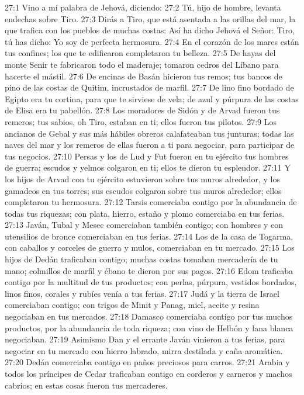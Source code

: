 27:1 Vino a mí palabra de Jehová, diciendo:   
27:2 Tú, hijo de hombre, levanta endechas sobre Tiro.   
27:3 Dirás a Tiro, que está asentada a las orillas del mar, la que trafica con los pueblos de muchas costas: Así ha dicho Jehová el Señor: Tiro, tú has dicho: Yo soy de perfecta hermosura.   
27:4 En el corazón de los mares están tus confines; los que te edificaron completaron tu belleza.   
27:5 De hayas del monte Senir te fabricaron todo el maderaje; tomaron cedros del Líbano para hacerte el mástil.   
27:6 De encinas de Basán hicieron tus remos; tus bancos de pino de las costas de Quitim, incrustados de marfil.   
27:7 De lino fino bordado de Egipto era tu cortina, para que te sirviese de vela; de azul y púrpura de las costas de Elisa era tu pabellón.   
27:8 Los moradores de Sidón y de Arvad fueron tus remeros; tus sabios, oh Tiro, estaban en ti; ellos fueron tus pilotos.   
27:9 Los ancianos de Gebal y sus más hábiles obreros calafateaban tus junturas; todas las naves del mar y los remeros de ellas fueron a ti para negociar, para participar de tus negocios.   
27:10 Persas y los de Lud y Fut fueron en tu ejército tus hombres de guerra; escudos y yelmos colgaron en ti; ellos te dieron tu esplendor.   
27:11 Y los hijos de Arvad con tu ejército estuvieron sobre tus muros alrededor, y los gamadeos en tus torres; sus escudos colgaron sobre tus muros alrededor; ellos completaron tu hermosura.   
27:12 Tarsis comerciaba contigo por la abundancia de todas tus riquezas; con plata, hierro, estaño y plomo comerciaba en tus ferias.   
27:13 Javán, Tubal y Mesec comerciaban también contigo; con hombres y con utensilios de bronce comerciaban en tus ferias.   
27:14 Los de la casa de Togarma, con caballos y corceles de guerra y mulos, comerciaban en tu mercado.   
27:15 Los hijos de Dedán traficaban contigo; muchas costas tomaban mercadería de tu mano; colmillos de marfil y ébano te dieron por sus pagos.   
27:16 Edom traficaba contigo por la multitud de tus productos; con perlas, púrpura, vestidos bordados, linos finos, corales y rubíes venía a tus ferias.   
27:17 Judá y la tierra de Israel comerciaban contigo; con trigos de Minit y Panag, miel, aceite y resina negociaban en tus mercados.   
27:18 Damasco comerciaba contigo por tus muchos productos, por la abundancia de toda riqueza; con vino de Helbón y lana blanca negociaban.   
27:19 Asimismo Dan y el errante Javán vinieron a tus ferias, para negociar en tu mercado con hierro labrado, mirra destilada y caña aromática.   
27:20 Dedán comerciaba contigo en paños preciosos para carros.   
27:21 Arabia y todos los príncipes de Cedar traficaban contigo en corderos y carneros y machos cabríos; en estas cosas fueron tus mercaderes.   
